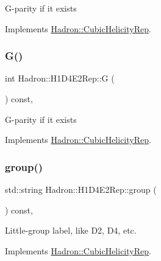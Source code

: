 G-\/parity if it exists 

Implements \mbox{\hyperlink{structHadron_1_1CubicHelicityRep_a50689f42be1e6170aa8cf6ad0597018b}{Hadron\+::\+Cubic\+Helicity\+Rep}}.

\mbox{\label{structHadron_1_1H1D4E2Rep_a89812641dc6e1a2786c442f6bc8775d7}} 
\subsubsection{\texorpdfstring{G()}{G()}\hspace{0.1cm}{\footnotesize\ttfamily [2/2]}}
{\footnotesize\ttfamily int Hadron\+::\+H1\+D4\+E2\+Rep\+::G (\begin{DoxyParamCaption}{ }\end{DoxyParamCaption}) const\hspace{0.3cm}{\ttfamily [inline]}, {\ttfamily [virtual]}}

G-\/parity if it exists 

Implements \mbox{\hyperlink{structHadron_1_1CubicHelicityRep_a50689f42be1e6170aa8cf6ad0597018b}{Hadron\+::\+Cubic\+Helicity\+Rep}}.

\mbox{\label{structHadron_1_1H1D4E2Rep_a136d615d32a53559950775a7e07d5650}} 
\subsubsection{\texorpdfstring{group()}{group()}\hspace{0.1cm}{\footnotesize\ttfamily [1/3]}}
{\footnotesize\ttfamily std\+::string Hadron\+::\+H1\+D4\+E2\+Rep\+::group (\begin{DoxyParamCaption}{ }\end{DoxyParamCaption}) const\hspace{0.3cm}{\ttfamily [inline]}, {\ttfamily [virtual]}}

Little-\/group label, like D2, D4, etc. 

Implements \mbox{\hyperlink{structHadron_1_1CubicHelicityRep_a101a7d76cd8ccdad0f272db44b766113}{Hadron\+::\+Cubic\+Helicity\+Rep}}.

\mbox{\label{structHadron_1_1H1D4E2Rep_a136d615d32a53559950775a7e07d5650}} 
